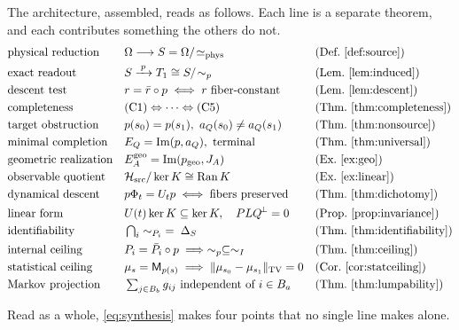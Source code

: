 \documentclass[11pt,reqno]{amsart}
\theoremstyle{plain}
\theoremstyle{definition}
\theoremstyle{remark}
\DeclareMathOperator{\Ima}{Im}
\DeclareMathOperator{\Ran}{Ran}
\newcommand{\Hsrc}{\mathcal{H}_{\mathrm{src}}}
\newcommand{\TV}{\mathrm{TV}}
\begin{document}
The architecture, assembled, reads as follows. Each line is a separate theorem, and each contributes something the others do not.
\begin{equation}\label{eq:synthesis}
\begin{aligned}
&\text{physical reduction} && \Omega\longrightarrow S=\Omega/\!\simeq_{\mathrm{phys}} &&\text{(Def.\ \ref{def:source})}\\
&\text{exact readout} && S\xrightarrow{\;p\;}T_1\cong S/\!\sim_p &&\text{(Lem.\ \ref{lem:induced})}\\
&\text{descent test} && r=\bar r\circ p \iff r\ \text{fiber-constant} &&\text{(Lem.\ \ref{lem:descent})}\\
&\text{completeness} && \text{(C1)}\Leftrightarrow\cdots\Leftrightarrow\text{(C5)} &&\text{(Thm.\ \ref{thm:completeness})}\\
&\text{target obstruction} && p(s_0)=p(s_1),\ a_Q(s_0)\neq a_Q(s_1) &&\text{(Thm.\ \ref{thm:nonsource})}\\
&\text{minimal completion} && E_Q=\Ima(p,a_Q),\ \text{terminal} &&\text{(Thm.\ \ref{thm:universal})}\\
&\text{geometric realization} && E_A^{\mathrm{geo}}=\Ima(p_{\mathrm{geo}},J_A) &&\text{(Ex.\ \ref{ex:geo})}\\
&\text{observable quotient} && \Hsrc/\ker K\cong\Ran K &&\text{(Ex.\ \ref{ex:linear})}\\
&\text{dynamical descent} && p\Phi_t=U_tp \iff \text{fibers preserved} &&\text{(Thm.\ \ref{thm:dichotomy})}\\
&\text{linear form} && U(t)\ker K\subseteq\ker K,\quad PLQ^{\!\perp}=0 &&\text{(Prop.\ \ref{prop:invariance})}\\
&\text{identifiability} && \textstyle\bigcap_{i}\sim_{P_i}\;=\;\Delta_S &&\text{(Thm.\ \ref{thm:identifiability})}\\
&\text{internal ceiling} && P_i=\bar P_i\circ p \implies \sim_p\subseteq\sim_I &&\text{(Thm.\ \ref{thm:ceiling})}\\
&\text{statistical ceiling} && \mu_s=\mathsf M_{p(s)} \implies \|\mu_{s_0}-\mu_{s_1}\|_{\TV}=0 &&\text{(Cor.\ \ref{cor:statceiling})}\\
&\text{Markov projection} && \textstyle\sum_{j\in B_b}g_{ij}\ \text{independent of}\ i\in B_a &&\text{(Thm.\ \ref{thm:lumpability})}
\end{aligned}
\end{equation}

Read as a whole, \eqref{eq:synthesis} makes four points that no single line makes alone.
\end{document}
